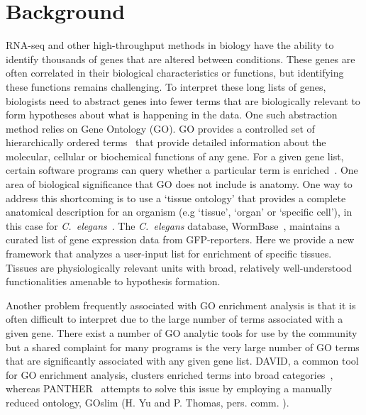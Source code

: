 \documentclass{bmcart}
\begin{document}
\section*{Background}
	RNA-seq and other high-throughput methods in biology have the ability to identify thousands of genes that are altered between conditions. These genes are often correlated in their biological characteristics or functions, but identifying these functions remains challenging. To interpret these long lists of genes, biologists need to abstract genes into fewer terms that are biologically relevant to form hypotheses about what is happening in the data. One such abstraction method relies on Gene Ontology (GO). GO provides a controlled set of hierarchically ordered terms~\cite{TheGeneOntologyConsortium2000a, TheGeneOntologyConsortium2015} that provide detailed information about the molecular, cellular or biochemical functions of any gene. For a given gene list, certain software programs can query whether a particular term is enriched~\cite{Mi2009, McLean2010, Huang2009}. One area of biological significance that GO does not include is anatomy. One way to address this shortcoming is to use a `tissue ontology' that provides a complete anatomical description for an organism (e.g `tissue', `organ' or `specific cell'), in this case for \emph{C.~elegans}~\cite{Lee2003}. The \emph{C.~elegans} database, WormBase~\cite{Howe2016}, maintains a curated list of gene expression data from GFP-reporters. Here we provide a new framework that analyzes a user-input list for enrichment of specific tissues. Tissues are physiologically relevant units with broad, relatively well-understood functionalities amenable to hypothesis formation. %

Another problem frequently associated with GO enrichment analysis is that it is often difficult to interpret due to the large number of terms associated with a given gene. There exist a number of GO analytic tools for use by the community but a shared complaint for many programs is the very large number of GO terms that are significantly associated with any given gene list. DAVID, a common tool for GO enrichment analysis, clusters enriched terms into broad categories~\cite{Huang2007}, whereas PANTHER~\cite{Mi2009, Mi2013} attempts to solve this issue by employing a manually reduced ontology, GOslim (H. Yu and P. Thomas, pers. comm. ). 
\end{document}
